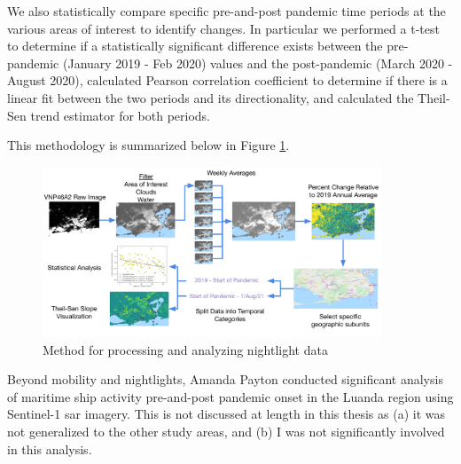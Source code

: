 We also statistically compare specific pre-and-post pandemic time periods at the various areas of interest to identify changes. In particular we performed a t-test to determine if a statistically significant difference exists between the pre-pandemic (January 2019 - Feb 2020) values and the post-pandemic (March 2020 - August 2020), calculated Pearson correlation coefficient to determine if there is a linear fit between the two periods and its directionality, and calculated the Theil-Sen trend estimator for both periods.

This methodology is summarized below in Figure \ref{fig:nightlights_method}.

\begin{figure}[!htb]
\centering
\includegraphics[width=0.9\textwidth]{Figures/chap5/nightlights_method.png}
\caption[Nightlights Processing Methodology]{Method for processing and analyzing nightlight data}
\label{fig:nightlights_method}
\end{figure}


%

Beyond mobility and nightlights, Amanda Payton conducted significant analysis of maritime ship activity pre-and-post pandemic onset in the Luanda region using Sentinel-1 \ac{sar} imagery. This is not discussed at length in this thesis as (a) it was not generalized to the other study areas, and (b) I was not significantly involved in this analysis.

